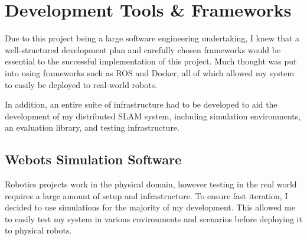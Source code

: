 







\section{Development Tools \& Frameworks}
\label{sec:development-tools-and-frameworks}
Due to this project being a large software engineering undertaking, I knew that a well-structured development plan and carefully chosen frameworks would be essential to the successful implementation of this project. Much thought was put into using frameworks such as ROS and Docker, all of which allowed my system to easily be deployed to real-world robots.

In addition, an entire suite of infrastructure had to be developed to aid the development of my distributed SLAM system, including simulation environments, an evaluation library, and testing infrastructure.

\subsection{Webots Simulation Software}
\label{sec:webots-simulator}

Robotics projects work in the physical domain, however testing in the real world requires a large amount of setup and infrastructure. To ensure fast iteration, I decided to use simulations for the majority of my development. This allowed me to easily test my system in various environments and scenarios before deploying it to physical robots.


